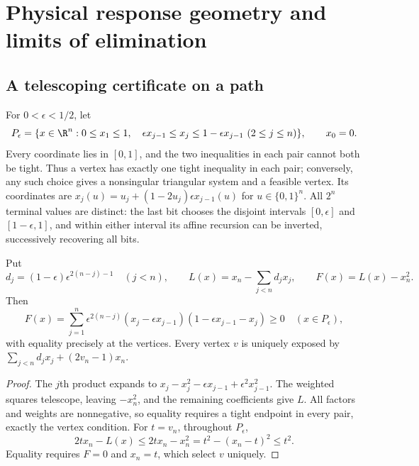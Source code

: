 \section{Physical response geometry and limits of elimination}\label{app:geometry}

\subsection{A telescoping certificate on a path}\label{s6:telescoping}
For $0<\epsilon<1/2$, let
\begin{equation}
 P_\epsilon=\{x\in\R^n:0\le x_1\le1,\quad
 \epsilon x_{j-1}\le x_j\le1-\epsilon x_{j-1}\ (2\le j\le n)\},
 \qquad x_0=0.\label{s6:km}
\end{equation}
Every coordinate lies in $[0,1]$, and the two inequalities in each pair
cannot both be tight. Thus a vertex has exactly one tight inequality in each
pair; conversely, any such choice gives a nonsingular triangular system
and a feasible vertex. Its coordinates are
$x_j(u)=u_j+(1-2u_j)\epsilon x_{j-1}(u)$ for $u\in\{0,1\}^n$.
All $2^n$ terminal values are distinct: the last bit chooses the disjoint
intervals $[0,\epsilon]$ and $[1-\epsilon,1]$, and within either interval
its affine recursion can be inverted, successively recovering all bits.

\begin{lemma}\label{s6:certificate}
Put
\[
 d_j=(1-\epsilon)\epsilon^{2(n-j)-1}\quad(j<n),\qquad
 L(x)=x_n-\sum_{j<n}d_jx_j,\qquad F(x)=L(x)-x_n^2.
\]
Then
\begin{equation}
 F(x)=\sum_{j=1}^n\epsilon^{2(n-j)}
 (x_j-\epsilon x_{j-1})(1-\epsilon x_{j-1}-x_j)\ge0
 \quad(x\in P_\epsilon),\label{s6:telescoping-identity}
\end{equation}
with equality precisely at the vertices. Every vertex $v$ is uniquely
exposed by $\sum_{j<n}d_jx_j+(2v_n-1)x_n$.
\end{lemma}
\begin{proof}
The $j$th product expands to
$x_j-x_j^2-\epsilon x_{j-1}+\epsilon^2x_{j-1}^2$.
The weighted squares telescope, leaving $-x_n^2$, and the remaining
coefficients give $L$. All factors and weights are nonnegative, so equality
requires a tight endpoint in every pair, exactly the vertex condition.
For $t=v_n$, throughout $P_\epsilon$,
\[
 2tx_n-L(x)\le 2tx_n-x_n^2=t^2-(x_n-t)^2\le t^2.
\]
Equality requires $F=0$ and $x_n=t$, which select $v$ uniquely.
\end{proof}

